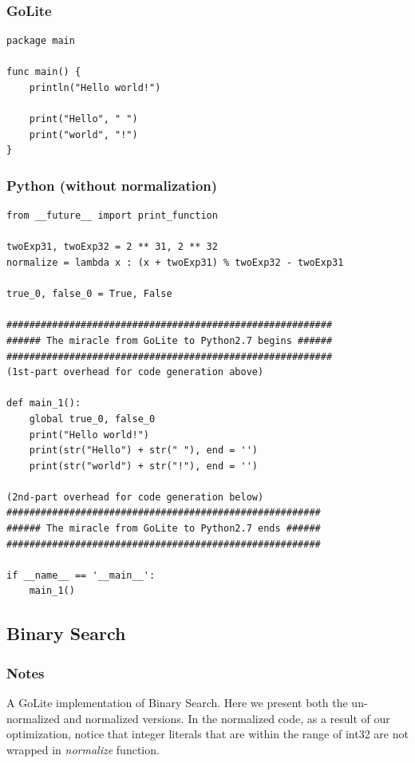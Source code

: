 \documentclass{article}
\begin{document}
\subsubsection{GoLite}
\begin{lstlisting}
package main

func main() {
    println("Hello world!")

    print("Hello", " ")
    print("world", "!")
}
\end{lstlisting}
\subsubsection{Python (without normalization)}
\begin{lstlisting}
from __future__ import print_function

twoExp31, twoExp32 = 2 ** 31, 2 ** 32
normalize = lambda x : (x + twoExp31) % twoExp32 - twoExp31

true_0, false_0 = True, False

#########################################################
###### The miracle from GoLite to Python2.7 begins ######
#########################################################
(1st-part overhead for code generation above)

def main_1():
	global true_0, false_0
	print("Hello world!")
	print(str("Hello") + str(" "), end = '')
	print(str("world") + str("!"), end = '')

(2nd-part overhead for code generation below)
#######################################################
###### The miracle from GoLite to Python2.7 ends ######
#######################################################

if __name__ == '__main__':
	main_1()
\end{lstlisting}


\subsection{Binary Search}

\subsubsection{Notes}
A GoLite implementation of Binary Search. Here we present both the
un-normalized and normalized versions. In the normalized code, as a
result of our optimization, notice that integer literals that are
within the range of int32 are not wrapped in \textit{normalize} function.
\end{document}
